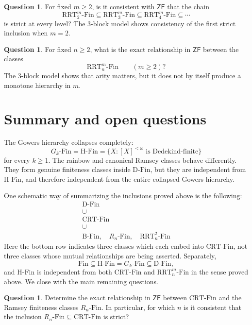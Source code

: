 \documentclass[11pt]{amsart}
\theoremstyle{definition}
\newtheorem{question}[theorem]{Question}
\newcommand{\ZF}{\mathsf{ZF}}
\newcommand{\Fin}{\mathrm{Fin}}
\newcommand{\DFin}{\mathrm{D\text{-}Fin}}
\newcommand{\BFin}{\mathrm{B\text{-}Fin}}
\newcommand{\HFin}{\mathrm{H\text{-}Fin}}
\newcommand{\RnFin}[1]{R_{#1}\text{-}\mathrm{Fin}}
\newcommand{\RRT}{\mathrm{RRT}}
\newcommand{\CRT}{\mathrm{CRT}}
\newcommand{\RRTFin}[2]{\RRT^{#1}_{#2}\text{-}\mathrm{Fin}}
\newcommand{\CRTFin}{\CRT\text{-}\mathrm{Fin}}
\begin{document}
\begin{question}
For fixed \(m\geq 2\), is it consistent with \(\ZF\) that the chain
\[
    \RRTFin{m}{2}
    \subseteq
    \RRTFin{m}{3}
    \subseteq
    \RRTFin{m}{4}
    \subseteq\cdots
\]
is strict at every level?  The \(3\)-block model shows consistency of the first strict inclusion when \(m=2\).
\end{question}

\begin{question}\label{q:m-direction}
For fixed \(n\geq 2\), what is the exact relationship in \(\ZF\) between the classes
\[
    \RRTFin{m}{n}\qquad (m\geq 2)?
\]
The \(3\)-block model shows that arity matters, but it does not by itself produce a monotone hierarchy in \(m\).
\end{question}

\section{Summary and open questions}

The Gowers hierarchy collapses completely:
\[
    G_k\text{-}\Fin=\HFin=\{X:[X]^{<\omega}\text{ is Dedekind-finite}\}
\]
for every \(k\geq 1\).  The rainbow and canonical Ramsey classes behave differently.  They form genuine finiteness classes inside \(\DFin\), but they are independent from \(\HFin\), and therefore independent from the entire collapsed Gowers hierarchy.

One schematic way of summarizing the inclusions proved above is the following:
\[
\begin{array}{c}
\DFin \\[0.6em]
\cup \\[0.2em]
\CRTFin \\[0.6em]
\cup \\[0.2em]
\BFin,\quad \RnFin{n},\quad \RRTFin{2}{n}
\end{array}
\]
Here the bottom row indicates three classes which each embed into \(\CRTFin\), not three classes whose mutual relationships are being asserted.  Separately,
\[
    \Fin\subseteq \HFin=G_k\text{-}\Fin\subseteq \DFin,
\]
and \(\HFin\) is independent from both \(\CRTFin\) and \(\RRTFin{m}{n}\) in the sense proved above.
We close with the main remaining questions.

\begin{question}
Determine the exact relationship in \(\ZF\) between \(\CRTFin\) and the Ramsey finiteness classes \(\RnFin{n}\).  In particular, for which \(n\) is it consistent that the inclusion \(\RnFin{n}\subseteq\CRTFin\) is strict?
\end{question}
\end{document}

